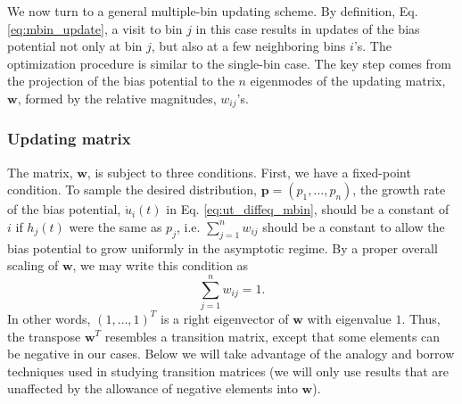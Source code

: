 \documentclass[reprint, superscriptaddress, floatfix]{revtex4-1}
\begin{document}
We now turn to a general multiple-bin updating scheme.
%
By definition, Eq. \eqref{eq:mbin_update},
a visit to bin $j$ in this case results in updates of the bias potential
not only at bin $j$, but also at a few neighboring bins $i$'s.
%
The optimization procedure is similar to the single-bin case.
%
The key step comes from the
projection of the bias potential to the $n$ eigenmodes
of the updating matrix, $\mathbf w$,
formed by the relative magnitudes, $w_{ij}$'s.



\subsubsection{\label{sec:updating-matrix}
Updating matrix}



The matrix, $\mathbf w$, is subject to three conditions.
%
First, we have a fixed-point condition\cite{bussi2006, dama2014}.
%
To sample the desired distribution,
$\mathbf p = (p_1, \dots, p_n)$,
the growth rate of the bias potential,
${\dot u}_i(t)$
in Eq. \eqref{eq:ut_diffeq_mbin},
should be a constant of $i$
if $h_j(t)$ were the same as $p_j$,
i.e.
$\sum_{j=1}^n w_{ij}$ should be a constant
to allow the bias potential to grow uniformly
in the asymptotic regime.
%
By a proper overall scaling of $\mathbf w$,
we may write this condition as
%
\begin{equation}
  \sum_{j = 1}^n w_{ij} = 1
  .
\label{eq:w_sumj}
\end{equation}
%
In other words, $(1, \dots, 1)^T$
is a right eigenvector of $\mathbf w$
with eigenvalue $1$.
%
Thus, the transpose $\mathbf w^T$
resembles a transition matrix,
except that some elements can be negative
in our cases.
%
Below we will take advantage of the analogy
and borrow techniques used
in studying transition matrices\cite{vankampen}
(we will only use results that are unaffected by the allowance
of negative elements into $\mathbf w$).
\end{document}
